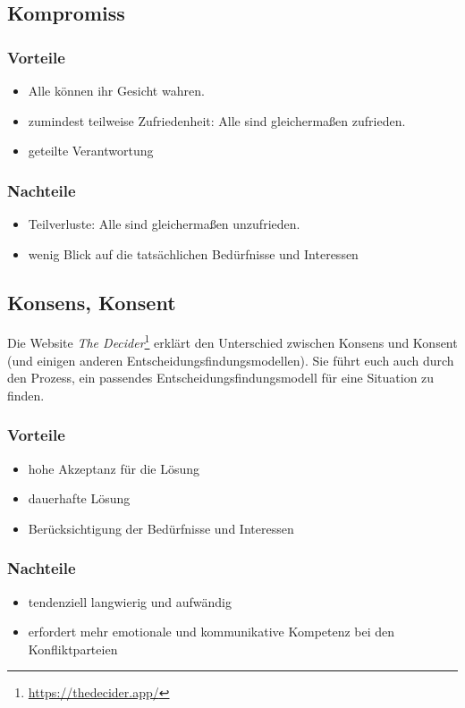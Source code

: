 \subsection{Kompromiss}

\subsubsection{Vorteile}
\begin{itemize}
    \item Alle können ihr Gesicht wahren.
    \item zumindest teilweise Zufriedenheit: Alle sind gleichermaßen zufrieden.
    \item geteilte Verantwortung
\end{itemize}

\subsubsection{Nachteile}
\begin{itemize}
    \item Teilverluste: Alle sind gleichermaßen unzufrieden.
    \item wenig Blick auf die tatsächlichen Bedürfnisse und Interessen
\end{itemize}

\subsection{Konsens, Konsent}

Die Website \emph{The Decider}\footnote{\url{https://thedecider.app/}} erklärt den Unterschied zwischen Konsens und Konsent (und einigen anderen Entscheidungsfindungsmodellen). Sie führt euch auch durch den Prozess, ein passendes Entscheidungsfindungsmodell für eine Situation zu finden.

\subsubsection{Vorteile}
\begin{itemize}
    \item hohe Akzeptanz für die Lösung
    \item dauerhafte Lösung
    \item Berücksichtigung der Bedürfnisse und Interessen
\end{itemize}

\subsubsection{Nachteile}
\begin{itemize}
    \item tendenziell langwierig und aufwändig
    \item erfordert mehr emotionale und kommunikative Kompetenz bei den Konfliktparteien
\end{itemize}
